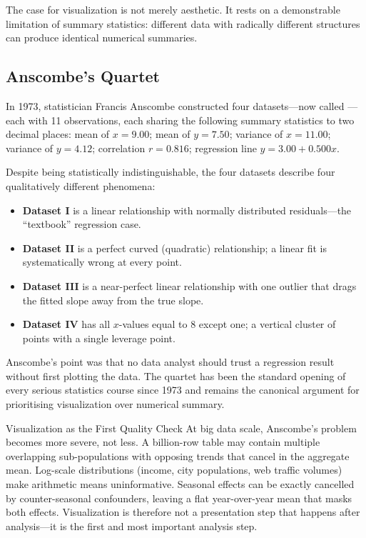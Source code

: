 The case for visualization is not merely aesthetic. It rests on a
demonstrable limitation of summary statistics: different data with
radically different structures can produce identical numerical summaries.

\subsection{Anscombe's Quartet}
\label{subsec:anscombe}

In 1973, statistician Francis Anscombe constructed four datasets---now
called ---each with 11 observations, each
sharing the following summary statistics to two decimal places:
mean of $x = 9.00$; mean of $y = 7.50$; variance of $x = 11.00$;
variance of $y = 4.12$; correlation $r = 0.816$; regression line
$\hat{y} = 3.00 + 0.500x$.

Despite being statistically indistinguishable, the four datasets describe
four qualitatively different phenomena:
\begin{itemize}
  \item \textbf{Dataset I} is a linear relationship with normally
        distributed residuals---the ``textbook'' regression case.
  \item \textbf{Dataset II} is a perfect curved (quadratic) relationship;
        a linear fit is systematically wrong at every point.
  \item \textbf{Dataset III} is a near-perfect linear relationship with
        one outlier that drags the fitted slope away from the true slope.
  \item \textbf{Dataset IV} has all $x$-values equal to 8 except one;
        a vertical cluster of points with a single leverage point.
\end{itemize}

Anscombe's point was that no data analyst should trust a regression result
without first plotting the data. The quartet has been the standard opening
of every serious statistics course since 1973 and remains the canonical
argument for prioritising visualization over numerical summary.

\begin{keyinsight}{Visualization as the First Quality Check}
At big data scale, Anscombe's problem becomes more severe, not less.
A billion-row table may contain multiple overlapping sub-populations
with opposing trends that cancel in the aggregate mean. Log-scale
distributions (income, city populations, web traffic volumes) make
arithmetic means uninformative. Seasonal effects can be exactly
cancelled by counter-seasonal confounders, leaving a flat year-over-year
mean that masks both effects. Visualization is therefore not a
presentation step that happens after analysis---it is the first and
most important analysis step.
\end{keyinsight}

